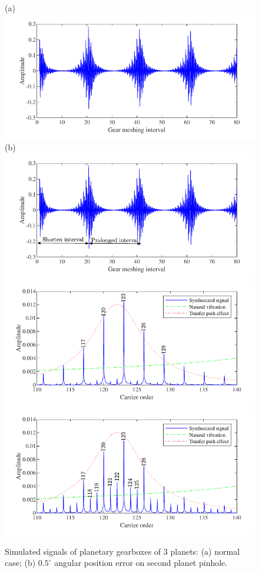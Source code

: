 \documentclass[a4paper,fleqn]{cas-sc}%
\begin{document}
\begin{figure}[pos=htbp]
    \centering
    (a) \includegraphics[scale=\myscale,valign=t]{Time_p3_normal.pdf}
    (b) \includegraphics[scale=\myscale,valign=t]{Time_p3_fault.pdf}\\
    \hspace*{1.5em}\includegraphics[scale=\myscale,valign=t]{Freq_p3_normal.pdf}
    \hspace*{1.5em}\includegraphics[scale=\myscale,valign=t]{Freq_p3_fault.pdf}
    \caption{Simulated signals of planetary gearboxes of 3 planets: (a) normal case; (b) $0.5^\circ$ angular position error on second planet pinhole.}
    \label{fig:simulated_p3}
\end{figure}
\end{document}
